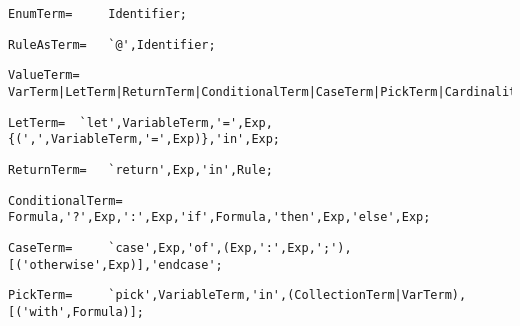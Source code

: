 \documentclass{article}
\begin{document}
    \begin{flushleft}
    \begin{lstlisting}[mathescape=true, breaklines=true]
      EnumTerm= 	Identifier;
    \end{lstlisting}
    \end{flushleft}
    \begin{flushleft}
    \begin{lstlisting}[mathescape=true, breaklines=true]
      RuleAsTerm= 	`@',Identifier;
    \end{lstlisting}
    \end{flushleft}
    \begin{flushleft}
    \begin{lstlisting}[mathescape=true, breaklines=true]
      ValueTerm= 	VarTerm|LetTerm|ReturnTerm|ConditionalTerm|CaseTerm|PickTerm|CardinalityTerm;
    \end{lstlisting}
    \end{flushleft}
    \begin{flushleft}
    \begin{lstlisting}[mathescape=true, breaklines=true]
      LetTerm= 	`let',VariableTerm,'=',Exp,{(',',VariableTerm,'=',Exp)},'in',Exp;
    \end{lstlisting}
    \end{flushleft}
    \begin{flushleft}
    \begin{lstlisting}[mathescape=true, breaklines=true]
      ReturnTerm= 	`return',Exp,'in',Rule;
    \end{lstlisting}
    \end{flushleft}
    \begin{flushleft}
    \begin{lstlisting}[mathescape=true, breaklines=true]
      ConditionalTerm= 	Formula,'?',Exp,':',Exp,'if',Formula,'then',Exp,'else',Exp;
    \end{lstlisting}
    \end{flushleft}
    \begin{flushleft}
    \begin{lstlisting}[mathescape=true, breaklines=true]
      CaseTerm= 	`case',Exp,'of',(Exp,':',Exp,';'),[('otherwise',Exp)],'endcase';
    \end{lstlisting}
    \end{flushleft}
    \begin{flushleft}
    \begin{lstlisting}[mathescape=true, breaklines=true]
      PickTerm= 	`pick',VariableTerm,'in',(CollectionTerm|VarTerm),[('with',Formula)];
    \end{lstlisting}
    \end{flushleft}
\end{document}
